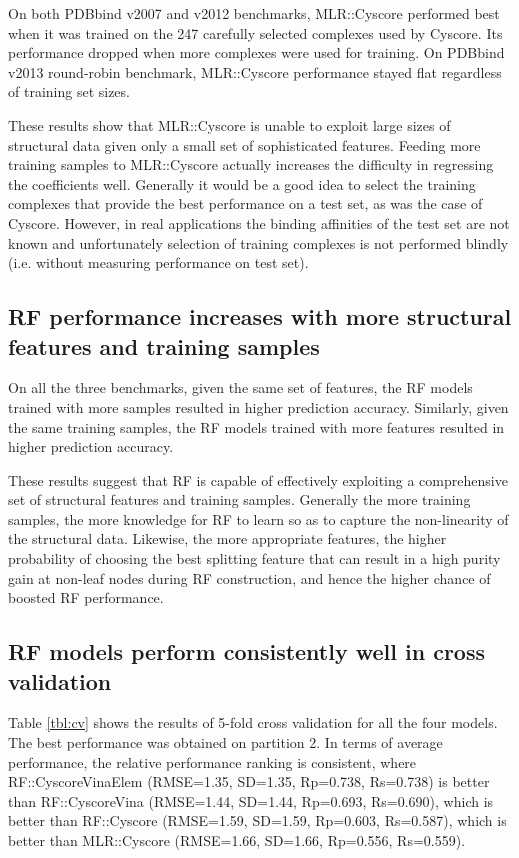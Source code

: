 \documentclass[twocolumn]{bmcart}
\begin{document}
On both PDBbind v2007 and v2012 benchmarks, MLR::Cyscore performed best when it was trained on the 247 carefully selected complexes used by Cyscore. Its performance dropped when more complexes were used for training. On PDBbind v2013 round-robin benchmark, MLR::Cyscore performance stayed flat regardless of training set sizes.

These results show that MLR::Cyscore is unable to exploit large sizes of structural data given only a small set of sophisticated features. Feeding more training samples to MLR::Cyscore actually increases the difficulty in regressing the coefficients well. Generally it would be a good idea to select the training complexes that provide the best performance on a test set, as was the case of Cyscore. However, in real applications the binding affinities of the test set are not known and unfortunately selection of training complexes is not performed blindly (i.e. without measuring performance on test set).

\subsection*{RF performance increases with more structural features and training samples}

On all the three benchmarks, given the same set of features, the RF models trained with more samples resulted in higher prediction accuracy. Similarly, given the same training samples, the RF models trained with more features resulted in higher prediction accuracy.

These results suggest that RF is capable of effectively exploiting a comprehensive set of structural features and training samples. Generally the more training samples, the more knowledge for RF to learn so as to capture the non-linearity of the structural data. Likewise, the more appropriate features, the higher probability of choosing the best splitting feature that can result in a high purity gain at non-leaf nodes during RF construction, and hence the higher chance of boosted RF performance.

\subsection*{RF models perform consistently well in cross validation}

Table \ref{tbl:cv} shows the results of 5-fold cross validation for all the four models. The best performance was obtained on partition 2. In terms of average performance, the relative performance ranking is consistent, where RF::CyscoreVinaElem (RMSE=1.35, SD=1.35, Rp=0.738, Rs=0.738) is better than RF::CyscoreVina (RMSE=1.44, SD=1.44, Rp=0.693, Rs=0.690), which is better than RF::Cyscore (RMSE=1.59, SD=1.59, Rp=0.603, Rs=0.587), which is better than MLR::Cyscore (RMSE=1.66, SD=1.66, Rp=0.556, Rs=0.559).
\end{document}
